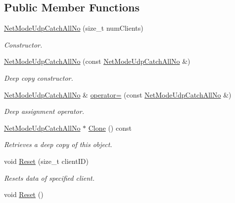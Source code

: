 \subsection*{Public Member Functions}
\begin{DoxyCompactItemize}
\item 
\hypertarget{class_net_mode_udp_catch_all_no_afcadd181f5d775d00c9a43ebe93e9382}{
\hyperlink{class_net_mode_udp_catch_all_no_afcadd181f5d775d00c9a43ebe93e9382}{NetModeUdpCatchAllNo} (size\_\-t numClients)}
\label{class_net_mode_udp_catch_all_no_afcadd181f5d775d00c9a43ebe93e9382}

\begin{DoxyCompactList}\small\item\em Constructor. \item\end{DoxyCompactList}\item 
\hyperlink{class_net_mode_udp_catch_all_no_a07fdb63785a26a76973fb10b73b63fc9}{NetModeUdpCatchAllNo} (const \hyperlink{class_net_mode_udp_catch_all_no}{NetModeUdpCatchAllNo} \&)
\begin{DoxyCompactList}\small\item\em Deep copy constructor. \item\end{DoxyCompactList}\item 
\hyperlink{class_net_mode_udp_catch_all_no}{NetModeUdpCatchAllNo} \& \hyperlink{class_net_mode_udp_catch_all_no_a5b9ad1157451cc04ca8fb46b77a96b1e}{operator=} (const \hyperlink{class_net_mode_udp_catch_all_no}{NetModeUdpCatchAllNo} \&)
\begin{DoxyCompactList}\small\item\em Deep assignment operator. \item\end{DoxyCompactList}\item 
\hyperlink{class_net_mode_udp_catch_all_no}{NetModeUdpCatchAllNo} $\ast$ \hyperlink{class_net_mode_udp_catch_all_no_aec441e93f9eb158bf09fd0013aca12a5}{Clone} () const 
\begin{DoxyCompactList}\small\item\em Retrieves a deep copy of this object. \item\end{DoxyCompactList}\item 
void \hyperlink{class_net_mode_udp_catch_all_no_abb09001562a985298f208ffd4f45825e}{Reset} (size\_\-t clientID)
\begin{DoxyCompactList}\small\item\em Resets data of specified client. \item\end{DoxyCompactList}\item 
\hypertarget{class_net_mode_udp_catch_all_no_adc5141cecbc925ac1d20779a599888bb}{
void \hyperlink{class_net_mode_udp_catch_all_no_adc5141cecbc925ac1d20779a599888bb}{Reset} ()}
\label{class_net_mode_udp_catch_all_no_adc5141cecbc925ac1d20779a599888bb}


\end{DoxyCompactItemize}
